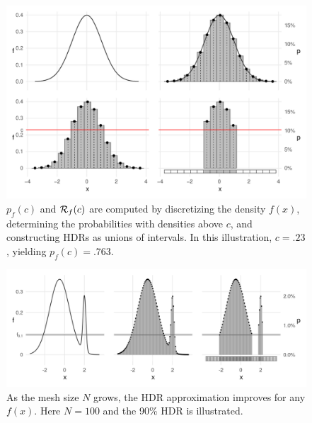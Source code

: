 \vspace{-1em}

\begin{knitrout}
\color{fgcolor}\begin{figure}[h!]

{\centering \includegraphics[width=\maxwidth]{figures/hdr-1d-1-1}

}
\caption{$p_{f}(c)$ and $\mathcal{R}_{f}(c)$ are computed by discretizing the density $f(x)$, determining the probabilities with densities above $c$, and constructing HDRs as unions of intervals.
In this illustration, $c = .23$, yielding $p_{f}(c) = .763$.
}\label{fig:hdr-1d-1}
\end{figure}

\end{knitrout}

\newpage


\begin{knitrout}
\color{fgcolor}\begin{figure}[h!]

{\centering \includegraphics[width=\maxwidth]{figures/hdr-1d-2-1}

}

\caption{As the mesh size $N$ grows, the HDR approximation improves for any $f(x)$. Here $N = 100$ and the 90\% HDR is illustrated.}\label{fig:hdr-1d-2}
\end{figure}

\end{knitrout}


